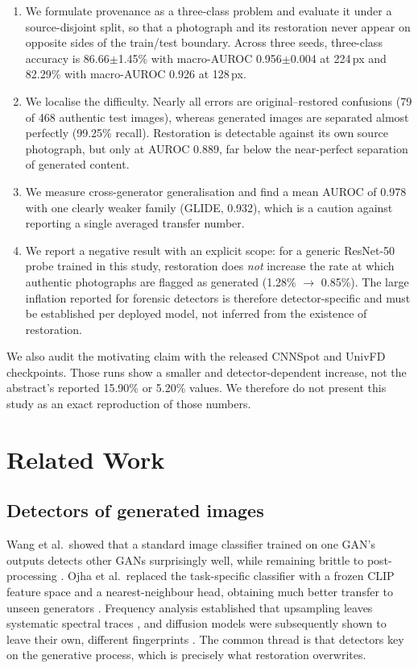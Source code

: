 \documentclass[runningheads]{llncs}
\begin{document}
\begin{enumerate}
\item We formulate provenance as a three-class problem and evaluate it under a
source-disjoint split, so that a photograph and its restoration never appear on
opposite sides of the train/test boundary. Across three seeds, three-class
accuracy is 86.66$\pm$1.45\% with macro-AUROC 0.956$\pm$0.004 at 224\,px and
82.29\% with macro-AUROC 0.926 at 128\,px.
\item We localise the difficulty. Nearly all errors are original--restored
confusions (79 of 468 authentic test images), whereas generated images are
separated almost perfectly (99.25\% recall). Restoration is detectable against its
own source photograph, but only at AUROC 0.889, far below the near-perfect
separation of generated content.
\item We measure cross-generator generalisation and find a mean AUROC of 0.978 with
one clearly weaker family (GLIDE, 0.932), which is a caution against reporting a
single averaged transfer number.
\item We report a negative result with an explicit scope: for a generic ResNet-50
probe trained in this study, restoration does \emph{not} increase the rate at which
authentic photographs are flagged as generated (1.28\% $\rightarrow$ 0.85\%). The
large inflation reported for forensic detectors is therefore detector-specific and
must be established per deployed model, not inferred from the existence of
restoration.
\end{enumerate}

We also audit the motivating claim with the released CNNSpot and UnivFD checkpoints.
Those runs show a smaller and detector-dependent increase, not the abstract's
reported 15.90\% or 5.20\% values. We therefore do not present this study as an
exact reproduction of those numbers.

\section{Related Work}

\subsection{Detectors of generated images}

Wang et al.\ showed that a standard image classifier trained on one GAN's outputs
detects other GANs surprisingly well, while remaining brittle to post-processing
\cite{wang2020cnnspot}. Ojha et al.\ replaced the task-specific classifier with a
frozen CLIP feature space and a nearest-neighbour head, obtaining much better
transfer to unseen generators \cite{ojha2023univfd}. Frequency analysis established
that upsampling leaves systematic spectral traces \cite{frank2020frequency}, and
diffusion models were subsequently shown to leave their own, different
fingerprints \cite{corvi2023diffusion,wang2023dire}. The common thread is that
detectors key on the generative process, which is precisely what restoration
overwrites.
\end{document}
